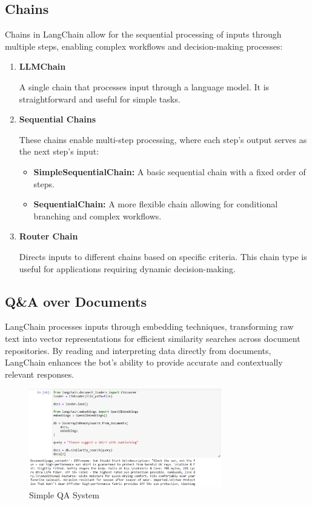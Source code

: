 \documentclass{article}
\begin{document}
\pagebreak

\subsection{Chains}

Chains in LangChain allow for the sequential processing of inputs through multiple steps, enabling complex workflows and decision-making processes:

\begin{enumerate}[label=\textbf{\arabic*.}, left=0pt, align=left, itemindent=*]
\setlength{\itemsep}{10pt}
    \item \textbf{LLMChain}

    A single chain that processes input through a language model. It is straightforward and useful for simple tasks.

    \item \textbf{Sequential Chains}

    These chains enable multi-step processing, where each step's output serves as the next step's input:
    \begin{itemize}[label=--]
        \item \textbf{SimpleSequentialChain:} A basic sequential chain with a fixed order of steps.
        \item \textbf{SequentialChain:} A more flexible chain allowing for conditional branching and complex workflows.
    \end{itemize}

    \item \textbf{Router Chain}

    Directs inputs to different chains based on specific criteria. This chain type is useful for applications requiring dynamic decision-making.
\end{enumerate}

\bigskip

\subsection{Q\&A over Documents}

LangChain processes inputs through embedding techniques, transforming raw text into vector representations for efficient similarity searches across document repositories. By reading and interpreting data directly from documents, LangChain enhances the bot's ability to provide accurate and contextually relevant responses.

\begin{figure}[h]
    \centering
    \includegraphics[width=0.75\textwidth]{Images/QA.png}
    \caption{Simple QA System}
    \label{fig:example}
\end{figure}
\end{document}
